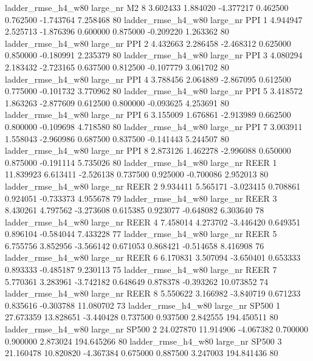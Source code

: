  ladder_rmse_h4_w80   large_nr       M2                 8  3.602433  1.884020  -4.377217 0.462500 0.762500 -1.743764    7.258468 80
 ladder_rmse_h4_w80   large_nr      PPI                 1  4.944947  2.525713  -1.876396 0.600000 0.875000 -0.209220    1.263362 80
 ladder_rmse_h4_w80   large_nr      PPI                 2  4.432663  2.286458  -2.468312 0.625000 0.850000 -0.180991    2.235379 80
 ladder_rmse_h4_w80   large_nr      PPI                 3  4.080294  2.183432  -2.723165 0.637500 0.812500 -0.107779    3.061702 80
 ladder_rmse_h4_w80   large_nr      PPI                 4  3.788456  2.064889  -2.867095 0.612500 0.775000 -0.101732    3.770962 80
 ladder_rmse_h4_w80   large_nr      PPI                 5  3.418572  1.863263  -2.877609 0.612500 0.800000 -0.093625    4.253691 80
 ladder_rmse_h4_w80   large_nr      PPI                 6  3.155009  1.676861  -2.913989 0.662500 0.800000 -0.109698    4.718580 80
 ladder_rmse_h4_w80   large_nr      PPI                 7  3.003911  1.558043  -2.960986 0.687500 0.837500 -0.141443    5.244507 80
 ladder_rmse_h4_w80   large_nr      PPI                 8  2.873126  1.462278  -2.996088 0.650000 0.875000 -0.191114    5.735026 80
 ladder_rmse_h4_w80   large_nr     REER                 1 11.839923  6.613411  -2.526138 0.737500 0.925000 -0.700086    2.952013 80
 ladder_rmse_h4_w80   large_nr     REER                 2  9.934411  5.565171  -3.023415 0.708861 0.924051 -0.733373    4.955678 79
 ladder_rmse_h4_w80   large_nr     REER                 3  8.430261  4.797562  -3.273608 0.615385 0.923077 -0.648082    6.303640 78
 ladder_rmse_h4_w80   large_nr     REER                 4  7.458014  4.273702  -3.446420 0.649351 0.896104 -0.584044    7.433228 77
 ladder_rmse_h4_w80   large_nr     REER                 5  6.755756  3.852956  -3.566142 0.671053 0.868421 -0.514658    8.416908 76
 ladder_rmse_h4_w80   large_nr     REER                 6  6.170831  3.507094  -3.650401 0.653333 0.893333 -0.485187    9.230113 75
 ladder_rmse_h4_w80   large_nr     REER                 7  5.770361  3.283961  -3.742182 0.648649 0.878378 -0.393262   10.073852 74
 ladder_rmse_h4_w80   large_nr     REER                 8  5.550622  3.166982  -3.840719 0.671233 0.835616 -0.303788   11.080702 73
 ladder_rmse_h4_w80   large_nr    SP500                 1 27.673359 13.828651  -3.440428 0.737500 0.937500  2.842555  194.450511 80
 ladder_rmse_h4_w80   large_nr    SP500                 2 24.027870 11.914906  -4.067382 0.700000 0.900000  2.873024  194.645266 80
 ladder_rmse_h4_w80   large_nr    SP500                 3 21.160478 10.820820  -4.367384 0.675000 0.887500  3.247003  194.841436 80
